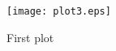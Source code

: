 \begin{figure}[H]
    \begin{center}
        \texttt{[image: plot3.eps]}
    \end{center}
    \caption{First plot}
    \label{fig:figure1}
\end{figure}
